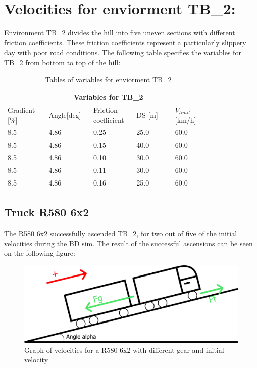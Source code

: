 \documentclass[noprint]{uit-thesis}
\begin{document}
\section{Velocities for enviorment TB\_2:}
Environment TB\_2 divides the hill into five uneven sections with different friction coefficients. These friction coefficients represent a particularly slippery day with poor road conditions. The following table specifies the variables for TB\_2 from bottom to top of the hill:
\renewcommand{\arraystretch}{1.2}
\begin{table}[H]
\center
\begin{tabular}{|p{0.17\linewidth} | p{0.16\linewidth} | p{0.16\linewidth} | p{0.16\linewidth} | p{0.17\linewidth} |} 

 \hline
\multicolumn{5}{|c|}{\textbf{Variables for TB\_2}} \\
 \hline 
Gradient [\%]  & Angle[deg]  & \makecell[l]{Friction\\coefficient} & DS [m]  & $V_{limit}$[km/h]  \\
\hline
8.5 & 4.86 & 0.25 & 25.0 & 60.0 \\
8.5 & 4.86 & 0.15 & 40.0 & 60.0 \\
8.5 & 4.86 & 0.10 & 30.0 & 60.0 \\
8.5 & 4.86 & 0.11 & 30.0 & 60.0 \\
8.5 & 4.86 & 0.16 & 25.0 & 60.0 \\
 \hline
\end{tabular}
\caption{Tables of variables for enviorment TB\_2}
\label{tab:TB2}
\end{table}

\subsection{Truck R580 6x2}
The R580 6x2 successfully ascended TB\_2, for two out of five of the initial velocities during the BD sim. The result of the successful ascensions can be seen on the following figure:
\begin{figure}[H]
\includegraphics[width=\textwidth, height=0.37\textheight]{photo/freeBodyDiagram.png}
\caption{Graph of velocities for a R580 6x2 with different gear and initial velocity}
\label{fig:TB2_6x2}
\end{figure}
\end{document}
